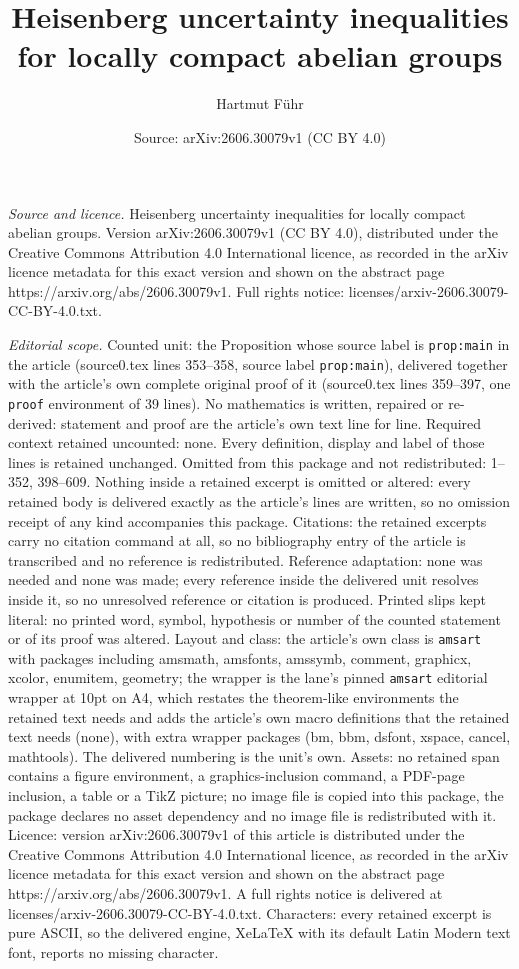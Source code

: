 \documentclass[10pt,a4paper]{amsart}
\title[Heisenberg uncertainty inequalities for locally compact abel]{Heisenberg uncertainty inequalities for locally compact abelian groups}
\author{Hartmut F\"uhr}
\date{Source: arXiv:2606.30079v1 (CC BY 4.0)}
\begin{document}
\maketitle

\noindent\emph{Source and licence.} Heisenberg uncertainty inequalities for locally compact abelian groups. Version arXiv:2606.30079v1 (CC BY 4.0), distributed under the Creative Commons Attribution 4.0 International licence, as recorded in the arXiv licence metadata for this exact version and shown on the abstract page https://arxiv.org/abs/2606.30079v1. Full rights notice: licenses/arxiv-2606.30079-CC-BY-4.0.txt.\par\smallskip

\noindent\textit{Editorial scope.} Counted unit: the Proposition whose source label is \texttt{prop:main} in the article (source0.tex lines 353--358, source label \texttt{prop:main}), delivered together with the article's own complete original proof of it (source0.tex lines 359--397, one \texttt{proof} environment of 39 lines). No mathematics is written, repaired or re-derived: statement and proof are the article's own text line for line. Required context retained uncounted: none. Every definition, display and label of those lines is retained unchanged. Omitted from this package and not redistributed: 1--352, 398--609. Nothing inside a retained excerpt is omitted or altered: every retained body is delivered exactly as the article's lines are written, so no omission receipt of any kind accompanies this package. Citations: the retained excerpts carry no citation command at all, so no bibliography entry of the article is transcribed and no reference is redistributed. Reference adaptation: none was needed and none was made; every reference inside the delivered unit resolves inside it, so no unresolved reference or citation is produced. Printed slips kept literal: no printed word, symbol, hypothesis or number of the counted statement or of its proof was altered. Layout and class: the article's own class is \texttt{amsart} with packages including amsmath, amsfonts, amssymb, comment, graphicx, xcolor, enumitem, geometry; the wrapper is the lane's pinned \texttt{amsart} editorial wrapper at 10pt on A4, which restates the theorem-like environments the retained text needs and adds the article's own macro definitions that the retained text needs (none), with extra wrapper packages (bm, bbm, dsfont, xspace, cancel, mathtools). The delivered numbering is the unit's own. Assets: no retained span contains a figure environment, a graphics-inclusion command, a PDF-page inclusion, a table or a TikZ picture; no image file is copied into this package, the package declares no asset dependency and no image file is redistributed with it. Licence: version arXiv:2606.30079v1 of this article is distributed under the Creative Commons Attribution 4.0 International licence, as recorded in the arXiv licence metadata for this exact version and shown on the abstract page https://arxiv.org/abs/2606.30079v1. A full rights notice is delivered at licenses/arxiv-2606.30079-CC-BY-4.0.txt. Characters: every retained excerpt is pure ASCII, so the delivered engine, XeLaTeX with its default Latin Modern text font, reports no missing character.
\end{document}
